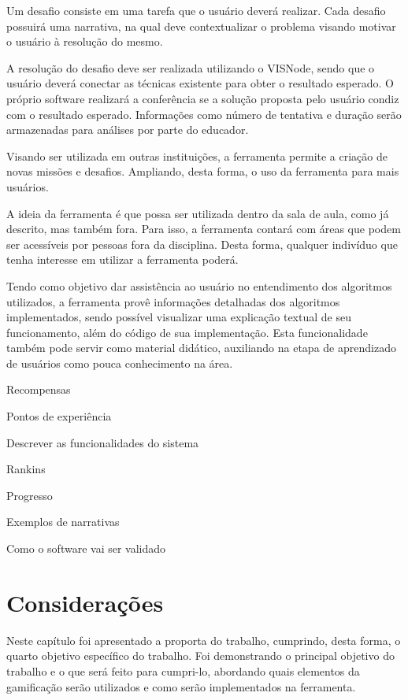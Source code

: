 \documentclass[
	12pt,				%
	oneside,			%
	a4paper,			%
	english,			%
	french,				%
	spanish,			%
	brazil,				%
	]{abntex2}
\begin{document}
Um desafio consiste em uma tarefa que o usuário deverá realizar. Cada desafio possuirá uma narrativa, na qual deve contextualizar o problema visando motivar o usuário à resolução do mesmo.

A resolução do desafio deve ser realizada utilizando o VISNode, sendo que o usuário deverá conectar as técnicas existente para obter o resultado esperado. O próprio software realizará a conferência se a solução proposta pelo usuário condiz com o resultado esperado. Informações como número de tentativa e duração serão armazenadas para análises por parte do educador.

Visando ser utilizada em outras instituições, a ferramenta permite a criação de novas missões e desafios. Ampliando, desta forma, o uso da ferramenta para mais usuários.

A ideia da ferramenta é que possa ser utilizada dentro da sala de aula, como já descrito, mas também fora. Para isso, a ferramenta contará com áreas que podem ser acessíveis por pessoas fora da disciplina. Desta forma, qualquer indivíduo que tenha interesse em utilizar a ferramenta poderá.

Tendo como objetivo dar assistência ao usuário no entendimento dos algoritmos utilizados, a ferramenta provê informações detalhadas dos algoritmos implementados, sendo possível visualizar uma explicação textual de seu funcionamento, além do código de sua implementação. Esta funcionalidade também pode servir como material didático, auxiliando na etapa de aprendizado de usuários como pouca conhecimento na área.

Recompensas

Pontos de experiência

Descrever as funcionalidades do sistema

Rankins

Progresso

Exemplos de narrativas

Como o software vai ser validado

\section{Considerações}

Neste capítulo foi apresentado a proporta do trabalho, cumprindo, desta forma, o quarto objetivo específico do trabalho. Foi demonstrando o principal objetivo do trabalho e o que será feito para cumpri-lo, abordando quais elementos da gamificação serão utilizados e como serão implementados na ferramenta.
\end{document}
